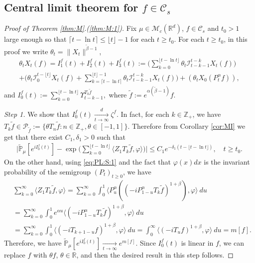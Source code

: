 \documentclass[12pt,a4paper]{amsart}
\theoremstyle{plain}
\theoremstyle{definition}
\numberwithin{equation}{section}
\begin{document}
\subsection{Central limit theorem for $f\in \mathcal C_s$}
\label{sec: small rate}

\begin{proof}[Proof of Theorem \ref{thm:M}.(\ref{thm:M:1})]
	Fix $\mu\in \mathcal M_c(\mathbb R^d)$, $f\in \mathcal C_s$ and $t_0 > 1$  large enough so that $ \lceil t - \ln t\rceil \leq \lfloor t \rfloor - 1$ for each $t\geq t_0$.
  For each $t\geq t_0$, in this proof we write $\theta_t = \|X_t\|^{\tilde \beta - 1}$,
  \begin{multline}
    \label{eq:PM:CLTS:1}
    \theta_t  X_t(f)
    = I^f_1(t) + I^f_2(t) + I^f_3(t)
    := \Big(\sum_{k=0}^{\lfloor t-\ln t \rfloor} \theta_t \mathcal I_{t-k-1}^{t-k} X_t(f) \Big)\\
    + \Big( \theta_t \mathcal I_0^{t-\lfloor t \rfloor} X_t(f)   + \sum_{k=\lceil t-\ln t \rceil}^{\lfloor t \rfloor-1} \theta_t \mathcal I_{t-k-1}^{t-k} X_t(f) \Big) + (\theta_t X_0(P_t^\alpha f) ),
  \end{multline}
  and $ I^f_0(t) := \sum_{k=0}^{\lfloor t-\ln t \rfloor} \Upsilon_{t-k-1}^{T_k \tilde f},$ where $\tilde f:= e^{\alpha(\tilde \beta - 1)} f$.

  \emph{Step 1.} We show that $I^f_0(t) \xrightarrow[t\to \infty]{d} \zeta^f$.
  In fact, for each $k \in \mathbb Z_+$, we have  $T_{k} \tilde f \in \mathcal P_{\tilde f}:=\{\theta T_n \tilde f: n \in \mathbb Z_+, \theta \in [-1,1]\}$.
  Therefore from Corollary \ref{cor:MI} we get that there exist $C_1,\delta_1 > 0$ such that
  \begin{align}
    \Big|\mathbb{\widetilde{P}}_{\mu} [e^{i I^f_0(t)} ]-\exp\Big(\sum_{k=0}^{\lfloor t-\ln t \rfloor} \langle Z_1T_{k}\tilde f, \varphi\rangle \Big)\Big|
    \leq C_1 e^{-\delta_1(t - \lfloor t - \ln t\rfloor)},
    \quad t\geq t_0.
  \end{align}
  On the other hand, using \eqref{eq:PL:S:1} and the fact that $\varphi(x)dx$ is the invariant probability of the semigroup $(P_t)_{t\geq 0}$, we have
  \begin{align}
    \label{eq:PM:CLTS:2}
    & \sum_{k=0}^\infty \langle Z_1 T_{k} \tilde f, \varphi \rangle
    = \sum_{k=0}^\infty \int_0^1 \langle P_u^\alpha ((-iP_{1 - u}^\alpha T_k \tilde f)^{1+\beta}), \varphi\rangle ~du
    \\& = \sum_{k=0}^\infty \int_0^1 e^{\alpha u} \langle  (-iP_{1 - u}^\alpha T_{k}\tilde f)^{1+\beta}, \varphi \rangle ~du
    \\& = \sum_{k=0}^\infty \int_0^1 \langle  (-iT_{k+1 - u} f)^{1+\beta}, \varphi\rangle~du
    = \int_0^\infty \langle  (-iT_{u} f)^{1+\beta}, \varphi\rangle~du = m[f].
  \end{align}
  Therefore, we have $\mathbb{\widetilde{P}}_{\mu} [e^{i I^f_0(t)} ] \xrightarrow[t\to \infty]{} e^{m[f]}$. Since $I_0^f(t)$ is linear in $f$, we can replace $f$ with $\theta f$, $\theta \in \mathbb R$, and then the desired result in this step follows.


\end{proof}
\end{document}
